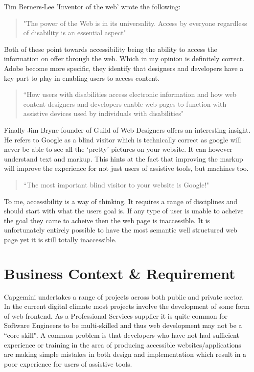 Tim Berners-Lee 'Inventor of the web' wrote the following:
\begin{quote}
"The power of the Web is in its universality. Access by everyone regardless
of disability is an essential aspect"
\end{quote}

Both of these point towards accessibility being the ability to access the
information on offer through the web. Which in my opinion is definitely
correct. Adobe become more specific, they identify that designers and
developers have a key part to play in enabling users to access content.

\begin{quote}
``How users with disabilities access electronic information and how web content
designers and developers enable web pages to function with assistive devices
used by individuals with disabilities"
\end{quote}

Finally Jim Bryne founder of Guild of Web Designers offers an interesting
insight. He refers to Google as a blind visitor which is technically correct
as google will never be able to see all the `pretty' pictures on your website.
It can however understand text and markup. This hints at the fact that
improving the markup will improve the experience for not just users of
assistive tools, but machines too.

\begin{quote}
``The most important blind visitor to your website is Google!"
\end{quote}

To me, accessibility is a way of thinking. It requires a range of disciplines
and should start with what the users goal is. If any type of user is unable to
acheive the goal they came to acheive then the web page is inaccessible. It
is unfortunately entirely possible to have the most semantic well
structured web page yet it is still totally inaccessible.

\section{Business Context \& Requirement}
Capgemini undertakes a range of projects across both public and private
sector. In the current digital climate most projects involve the
development of some form of web frontend. As a Professional Services supplier it
 is quite common for Software Engineers to be multi-skilled and thus web
 development may not be a ``core skill". A common problem is that developers
 who have not had sufficient experience or training in the area of producing
 accessible websites/applications are making simple mistakes in both design and
 implementation which result in a poor experience for users of assistive tools.

